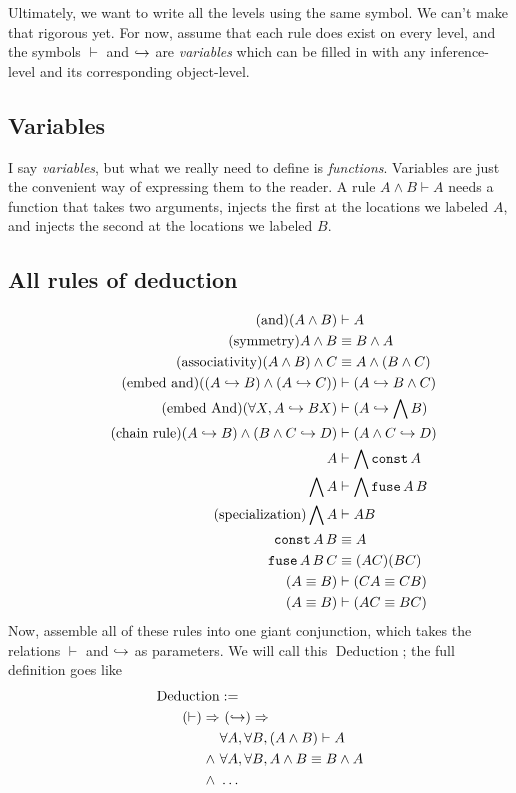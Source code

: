 \documentclass{article}
\begin{document}
  Ultimately, we want to write all the levels using the same symbol. We can't make that rigorous yet. For now, assume that each rule does exist on every level, and the symbols $\vdash$ and $\hookrightarrow$ are \emph{variables} which can be filled in with any inference-level and its corresponding object-level.
  
  \subsection{Variables}
  
  I say \emph{variables}, but what we really need to define is \emph{functions}. Variables are just the convenient way of expressing them to the reader. A rule $A \wedge B \vdash A$ needs a function that takes two arguments, injects the first at the locations we labeled $A$, and injects the second at the locations we labeled $B$.
  
  
  \subsection{All rules of deduction}

  \begin{align*}
    \tag{and}
    (A \wedge B) &\vdash A\\
    \tag{symmetry}
    A \wedge B &\equiv B \wedge A\\
    \tag{associativity}
    (A \wedge B) \wedge C &\equiv A \wedge (B \wedge C)\\
    \tag{embed and}
    ((A \hookrightarrow B) \wedge (A \hookrightarrow C)) &\vdash (A \hookrightarrow B \wedge C)\\
    \tag{embed And}
    (\forall X, A \hookrightarrow B X) &\vdash (A \hookrightarrow \bigwedge B)\\
    \tag{chain rule}
    (A \hookrightarrow B) \wedge (B \wedge C \hookrightarrow D) &\vdash (A \wedge C \hookrightarrow D)\\
    A &\vdash \bigwedge \operatorname{\texttt{const}} A\\
    \bigwedge A &\vdash \bigwedge \operatorname{\texttt{fuse}} A\,B\\
    \tag{specialization}
    \bigwedge A &\vdash AB\\
    \operatorname{\texttt{const}} A\,B &\equiv A\\
    \operatorname{\texttt{fuse}} A\,B\,C &\equiv (AC)(BC)\\
    (A \equiv B) &\vdash (CA \equiv CB)\\
    (A \equiv B) &\vdash (AC \equiv BC)\\
  \end{align*}
  \newcommand{\deduction}{\operatorname{\mathrm{Deduction}}}
  Now, assemble all of these rules into one giant conjunction, which takes the relations $\vdash$ and $\hookrightarrow$ as parameters. We will call this $\deduction$; the full definition goes like
  \begin{align*}
    \deduction& :=\\
    \nameabst{(\vdash)}&\ \nameabst{(\objto)}\\
    &\forall A, \forall B, (A \wedge B) \vdash A\\
    \wedge\ &\forall A, \forall B, A \wedge B \equiv B \wedge A\\
    \wedge\ &\dots\\
  \end{align*}
  
\end{document}
